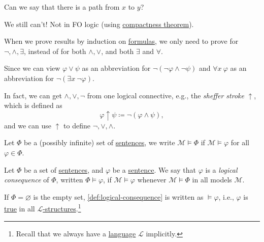 \begin{problem*}
	Can we say that there is a path from \(x\) to \(y\)?
\end{problem*}
\begin{answer}
	We still can't! Not in FO logic (using \hyperref[thm:compactness]{compactness theorem}).
\end{answer}

\begin{remark}
	When we prove results by induction on \hyperref[def:formula]{formulas}, we only need to prove for \(\lnot , \land , \exists \), instead of for both \(\land , \lor \), and both \(\exists \) and \(\forall \).
\end{remark}
\begin{explanation}
	Since we can view \(\varphi \lor \psi \) as an abbreviation for \(\lnot (\lnot \varphi \land \lnot \psi ) \) and \(\forall x\ \varphi \) as an abbreviation for \(\lnot (\exists x\ \lnot \varphi )\).
\end{explanation}

\begin{remark}
	In fact, we can get \(\land , \lor , \lnot\) from one logical connective, e.g., the \emph{sheffer stroke} \(\uparrow \), which is defined as
	\[
		\varphi \uparrow \psi \coloneqq \lnot(\varphi \land \psi ),
	\]
	and we can use \(\uparrow \) to define \(\lnot, \lor , \land \).
\end{remark}

\begin{notation}
	Let \(\Phi \) be a (possibly infinite) set of \hyperref[def:sentence]{sentences}, we write \(\mathcal{M} \models \Phi \) if \(\mathcal{M} \models \varphi \) for all \(\varphi \in \Phi \).
\end{notation}

\begin{definition}\label{def:logical-consequence}
	Let \(\Phi \) be a set of \hyperref[def:sentence]{sentences}, and \(\varphi \) be a \hyperref[def:sentence]{sentence}. We say that \(\varphi \) is a \emph{logical consequence} of \(\Phi \), written \(\Phi \models \varphi \), if \(\mathcal{M} \models \varphi \) whenever \(\mathcal{M} \models \Phi \) in all models \(\mathcal{M} \).
\end{definition}

If \(\Phi = \varnothing \) is the empty set, \autoref{def:logical-consequence} is written as \(\models \varphi \), i.e., \(\varphi \) is \hyperref[def:truth]{true} in all \hyperref[def:structure]{\(\mathcal{L} \)-structures}.\footnote{Recall that we always have a \hyperref[def:language]{language} \(\mathcal{L} \) implicitly.}

